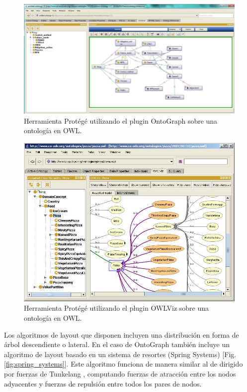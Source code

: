 \begin{figure}
	\centering
	\includegraphics[width=13cm]{imagenes/ontograph.png}
	\caption{Herramienta Protégé utilizando el plugin OntoGraph sobre una ontología en OWL.}
	\label{fig:ontograph}
\end{figure}
\begin{figure}
	\centering
	\includegraphics[width=13cm]{imagenes/owlviz.jpg}
	\caption{Herramienta Protégé utilizando el plugin OWLViz sobre una ontología en OWL.}
	\label{fig:owlviz}
\end{figure}

Los algoritmos de layout que disponen incluyen una distribución en forma de árbol descendiente o lateral. En el caso de OntoGraph también incluye un algoritmo de layout basado en un sistema de resortes (Spring Systems) \cite{kobourov2012spring}[Fig. \ref{fig:spring_systems}]. Este algoritmo funciona de manera similar al de dirigido por fuerzas de Tunkelang \cite{tunkelang1998jiggle}, computando fuerzas de atracción entre los nodos adyacentes y fuerzas de repulsión entre todos los pares de nodos.

